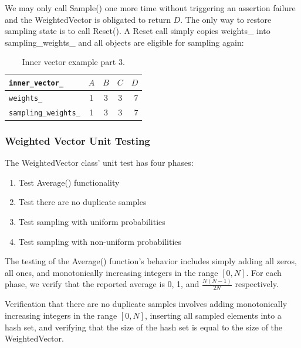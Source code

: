 \documentclass[12pt]{article}
\begin{document}
    We may only call Sample() one more time without triggering an assertion
    failure and the WeightedVector is obligated to return $D$. The only way to
    restore sampling state is to call Reset(). A Reset call simply copies
    weights\_ into sampling\_weights\_ and all objects are eligible for
    sampling again:

    \begin{table}
      \caption{Inner vector example part 3.}
      \begin{center}
      \begin{tabular}{ | l | c | c | c | r | }
        \hline
        \verb|inner_vector_| & $A$ & $B$ & $C$ & $D$ \\ \hline
        \verb|weights_| & 1 & 3 & 3 & 7 \\ \hline
        \verb|sampling_weights_| & 1 & 3 & 3 & 7 \\ \hline
        \hline
      \end{tabular}
      \end{center}
    \end{table}


    \subsubsection{Weighted Vector Unit Testing}

    The WeightedVector class' unit test has four phases:

    \begin{enumerate}
      \item Test Average() functionality
      \item Test there are no duplicate samples
      \item Test sampling with uniform probabilities
      \item Test sampling with non-uniform probabilities
    \end{enumerate}

    The testing of the Average() function's behavior includes simply adding all
    zeros, all ones, and monotonically increasing integers in the range
    $[0,N]$. For each phase, we verify that the reported average is 0, 1, and
    $\frac{N(N-1)}{2N}$ respectively.  

    Verification that there are no duplicate samples involves adding
    monotonically increasing integers in the range $[0,N]$, inserting all
    sampled elements into a hash set, and verifying that the size of the hash
    set is equal to the size of the WeightedVector.
\end{document}
